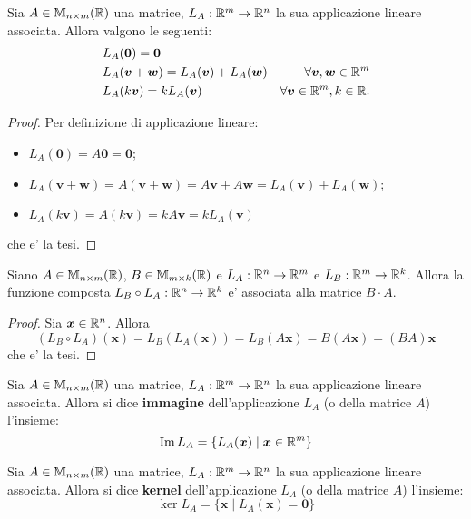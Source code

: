 \begin{proposition}
    Sia $A \in \mathbb{M}_{n \times m}(\mathbb{R})$ una matrice, $L_A : \mathbb{R}^m \to \mathbb{R}^n$ la sua applicazione lineare associata. Allora valgono le seguenti:
    \begin{align}
        &L_A(\bm 0) = \bm 0 \\
        &L_A(\bm v + \bm w) = L_A(\bm v) + L_A(\bm w) &\forall \bm v, \bm w \in \mathbb{R}^m \\
        &L_A(k\bm v) = kL_A(\bm v) &\forall \bm v \in \mathbb{R}^m, k \in \mathbb{R}. 
    \end{align}
\end{proposition}
\begin{proof}
    Per definizione di applicazione lineare:
    \begin{itemize}
        \item $L_A(\bm 0) = A\bm 0 = \bm 0$;
        \item $L_A(\bm v + \bm w) = A(\bm v + \bm w) = A\bm v + A\bm w = L_A(\bm v) + L_A(\bm w)$;
        \item $L_A(k\bm v) = A(k\bm v) = kA\bm v = kL_A(\bm v)$
    \end{itemize}
    che e' la tesi.
\end{proof}

\begin{proposition}
    Siano $A \in \mathbb{M}_{n \times m}(\mathbb{R})$, $B \in \mathbb{M}_{m \times k}(\mathbb{R})$ e $L_A : \mathbb{R}^n \to \mathbb{R}^m$ e $L_B : \mathbb{R}^m \to \mathbb{R}^k$. Allora la funzione composta $L_B \circ L_A : \mathbb{R}^n \to \mathbb{R}^k$ e' associata alla matrice $B\cdot A$.
\end{proposition}
\begin{proof}
    Sia $\bm{x} \in \mathbb{R}^n$. Allora
    \[
        (L_B \circ L_A)(\bm{x}) = L_B(L_A(\bm{x})) = L_B(A\bm{x}) = B(A\bm{x}) = (BA)\bm{x}
    \]
    che e' la tesi.
\end{proof}

\begin{definition}
    Sia $A \in \mathbb{M}_{n \times m}(\mathbb{R})$ una matrice, $L_A : \mathbb{R}^m \to \mathbb{R}^n$ la sua applicazione lineare associata. Allora si dice \textbf{immagine} dell'applicazione $L_A$ (o della matrice $A$) l'insieme:
    \begin{equation}
        \operatorname{Im}L_A = \{L_A(\bm x) \mid \bm x \in \mathbb{R}^m\}
    \end{equation}
\end{definition}

\begin{definition}
    Sia $A \in \mathbb{M}_{n \times m}(\mathbb{R})$ una matrice, $L_A : \mathbb{R}^m \to \mathbb{R}^n$ la sua applicazione lineare associata. Allora si dice \textbf{kernel} dell'applicazione $L_A$ (o della matrice $A$) l'insieme:
    \begin{equation}
        \ker{L_A} = \{\bm x \mid L_A(\bm x) = \bm 0\}
    \end{equation}
\end{definition}

